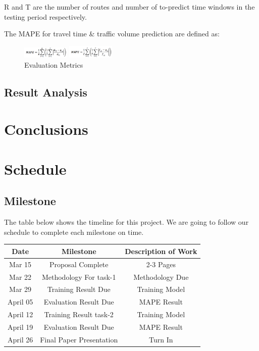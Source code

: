 \documentclass[journal, letterpaper]{IEEEtran}
\begin{document}
R and T are the number of routes and number of to-predict time windows in the testing period respectively.

The MAPE for travel time \& traffic volume prediction are defined as:

\begin{figure} [H]
  \centering
  \includegraphics[width=0.2\textwidth]{MAPE.png}
  
  \includegraphics[width=0.2\textwidth]{MAPE-2.png}
  \caption{Evaluation Metrics}
  \captionsetup{justification=centering}
  \label{fig:13}
\end{figure}

\subsection{Result Analysis}

\section{Conclusions}
\large

\section{Schedule}
\large
\subsection{Milestone}
The table below shows the timeline for this project. We are going to follow our schedule to complete each milestone on time.
\begin{table}[ht]
\centering %
\begin{tabular}{c| c| c} %
\hline\hline %
Date & Milestone & Description of Work  \\  %
\hline %
Mar 15 & Proposal Complete & 2-3 Pages  \\ %
\hline
Mar 22 & Methodology For task-1 & Methodology Due  \\
\hline
Mar 29 & Training Result Due & Training Model  \\
\hline
April 05 & Evaluation Result Due & MAPE Result  \\  %
\hline
April 12 & Training Result task-2 & Training Model \\
\hline
April 19 & Evaluation Result Due & MAPE Result \\
\hline
April 26 & Final Paper Presentation & Turn In \\
\hline %
\end{tabular}
\label{table:nonlin} %
\end{table}
\end{document}
